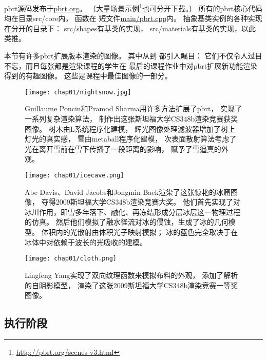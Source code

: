 pbrt源码发布于\href{https://pbrt.org/}{\ttfamily pbrt.org}。
（大量场景示例\footnote{\url{http://pbrt.org/scenes-v3.html}}也可分开下载。）
所有的pbrt核心代码均在目录{\ttfamily src/core}内，
函数在
短文件\href{https://github.com/mmp/pbrt-v3/tree/master/src/main/pbrt.cpp}{\ttfamily main/pbrt.cpp}内。
抽象基类实例的各种实现在分开的目录下：
{\ttfamily src/shapes}有基类的实现，
{\ttfamily src/materials}有基类的实现，以此类推。

本节有许多pbrt扩展版本渲染的图像。
其中从到
都引人瞩目：
它们不仅令人过目不忘，而且每张都是渲染课程的学生在
最后的课程作业中对pbrt扩展新功能渲染得到的有趣图像。
这些是课程中最佳图像的一部分。
\begin{figure}[ht]
    \centering\texttt{[image: chap01/nightsnow.jpg]}
    \caption{Guillaume Poncin和Pramod Sharma用许多方法扩展了pbrt，
        实现了一系列复杂渲染算法，
        制作出这张斯坦福大学CS348b渲染竞赛获奖图像。
        树木由L系统程序化建模，
        辉光图像处理滤波器增加了树上灯光的真实感，
        雪由metaball程序化建模，
        次表面散射算法考虑了光在离开雪前在雪下传播了一段距离的影响，
        赋予了雪逼真的外观。}
    \label{fig:1.11}
\end{figure}
\begin{figure}[ht]
    \centering\texttt{[image: chap01/icecave.png]}
    \caption{Abe Davis、David Jacobs和Jongmin Baek渲染了这张惊艳的冰窟图像，
        夺得2009斯坦福大学CS348b渲染竞赛大奖。
        他们首先实现了对冰川作用，即雪多年落下、融化、再冻结形成分层冰层这一物理过程的仿真。
        然后他们模拟了融水径流对冰的侵蚀，生成了冰的几何模型。
        体积内的光散射由体积光子映射模拟；
        冰的蓝色完全取决于在冰体中对依赖于波长的光吸收的建模。}
    \label{fig:1.12}
\end{figure}
\begin{figure}[ht]
    \centering\texttt{[image: chap01/cloth.png]}
    \caption{Lingfeng Yang实现了双向纹理函数来模拟布料的外观，
        添加了解析的自阴影模型，
        渲染了这张2009斯坦福大学CS348b渲染竞赛一等奖图像。}
    \label{fig:1.13}
\end{figure}

\subsection{执行阶段}\label{sub:执行阶段}


